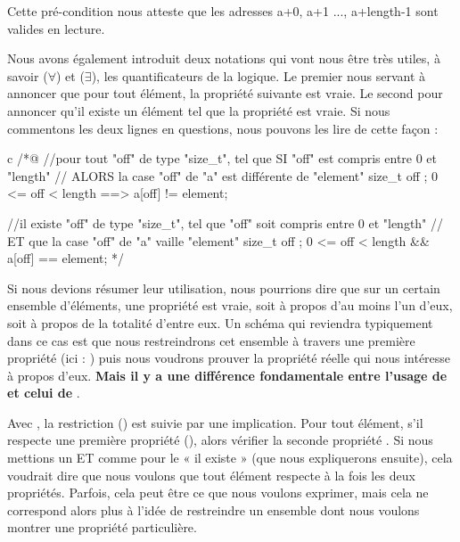 Cette pré-condition nous atteste que les adresses a+0, a+1 ..., a+length-1 sont
valides en lecture.



Nous avons également introduit deux notations qui vont nous être très utiles, à 
savoir  ($\forall$) et  ($\exists$), les 
quantificateurs de la logique. Le premier nous servant à annoncer que pour tout
élément, la propriété suivante est vraie. Le second pour annoncer qu'il existe
un élément tel que la propriété est vraie. Si nous commentons les deux lignes en 
questions, nous pouvons les lire de cette façon :



\begin{CodeBlock}{c}
/*@
//pour tout "off" de type "size_t", tel que SI "off" est compris entre 0 et "length"
//                                 ALORS la case "off" de "a" est différente de "element"
\forall size_t off ; 0 <= off < length ==> a[off] != element;

//il existe "off" de type "size_t", tel que "off" soit compris entre 0 et "length"
//                                 ET que la case "off" de "a" vaille "element"
\exists size_t off ; 0 <= off < length && a[off] == element;
*/
\end{CodeBlock}



Si nous devions résumer leur utilisation, nous pourrions dire que sur un certain
ensemble d'éléments, une propriété est vraie, soit à propos d'au moins l'un
d'eux, soit à propos de la totalité d'entre eux. Un schéma qui reviendra 
typiquement dans ce cas est que nous restreindrons cet ensemble à travers une
première propriété (ici : ) puis nous voudrons prouver la
propriété réelle qui nous intéresse à propos d'eux. \textbf{Mais il y a une 
différence fondamentale entre l'usage de  et celui de }.



Avec , la restriction () est suivie
par une implication. Pour tout élément, s'il respecte une première propriété 
(), alors vérifier la seconde propriété . Si nous mettions un ET
comme pour le « il existe » (que nous expliquerons ensuite), cela voudrait dire que 
nous voulons que tout élément respecte à la fois les deux propriétés. Parfois, 
cela peut être ce que nous voulons exprimer, mais cela ne correspond alors plus 
à l'idée de restreindre un ensemble dont nous voulons montrer une propriété 
particulière.



